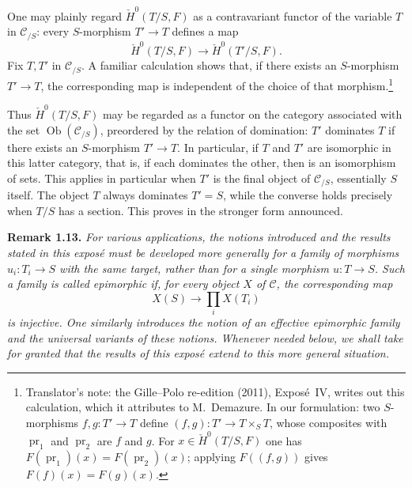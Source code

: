 One may plainly regard \(\check H^{0}(T/S,F)\) as a contravariant functor of
the variable \(T\) in \(\mathscr C_{/S}\): every \(S\)-morphism \(T'\to T\)
defines a map
\[
\tag{+}\label{sga3:iv:proposition:1:12:eq:unnamed:01}
  \check H^{0}(T/S,F)\longrightarrow\check H^{0}(T'/S,F).
\]
Fix \(T,T'\) in \(\mathscr C_{/S}\). A familiar calculation shows that, if
there exists an \(S\)-morphism \(T'\to T\), the corresponding map  is
independent of the choice of that morphism.\footnote{Translator's note: the Gille--Polo re-edition (2011), Expos\'e~IV, writes
out this calculation, which it attributes to M.~Demazure. In our formulation:
two \(S\)-morphisms \(f,g\colon T'\to T\) define
\((f,g)\colon T'\to T\times_ST\), whose composites with
\(\operatorname{pr}_1\) and \(\operatorname{pr}_2\) are \(f\) and \(g\). For
\(x\in\check H^0(T/S,F)\) one has
\(F(\operatorname{pr}_1)(x)=F(\operatorname{pr}_2)(x)\); applying
\(F((f,g))\) gives \(F(f)(x)=F(g)(x)\).}

Thus \(\check H^{0}(T/S,F)\) may be regarded as a functor on the category
associated with the set \(\operatorname{Ob}(\mathscr C_{/S})\), preordered
by the relation of domination: \(T'\) dominates \(T\) if there exists an
\(S\)-morphism \(T'\to T\). In particular, if \(T\) and \(T'\) are
isomorphic in this latter category, that is, if each dominates the other,
then  is an isomorphism of sets. This applies in particular when \(T'\)
is the final object of \(\mathscr C_{/S}\), essentially \(S\) itself. The
object \(T\) always dominates \(T'=S\), while the converse holds precisely
when \(T/S\) has a section. This proves  in the stronger form announced.

\medskip
\noindent{}\textbf{Remark 1.13.}
\textit{For various applications, the notions introduced and the results
stated in this expos\'e must be developed more generally for a family of
morphisms \(u_i:T_i\to S\) with the same target, rather than for a single
morphism \(u:T\to S\). Such a family is called \emph{epimorphic} if, for
every object \(X\) of \(\mathscr C\), the corresponding map}
\[
  X(S)\longrightarrow\prod_i X(T_i)
\]
\textit{is injective. One similarly introduces the notion of an effective
epimorphic family and the universal variants of these notions. Whenever
needed below, we shall take for granted that the results of this expos\'e
extend to this more general situation.}

